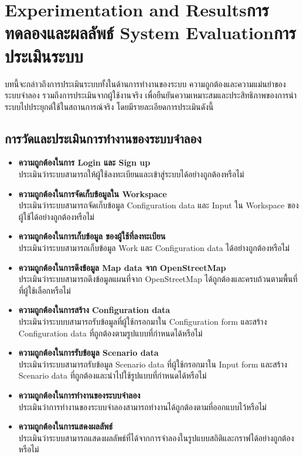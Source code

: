 \chapter{\ifproject%
\ifenglish Experimentation and Results\else การทดลองและผลลัพธ์\fi
\else%
\ifenglish System Evaluation\else การประเมินระบบ\fi
\fi}
\begin{mypara}
    \indent บทนี้จะกล่าวถึงการประเมินระบบทั้งในด้านการทำงานของระบบ ความถูกต้องและความแม่นยำของระบบจำลอง 
    รวมถึงการประเมินจากผู้ใช้งานจริง เพื่อยืนยันความเหมาะสมและประสิทธิภาพของการนำระบบไปประยุกต์ใช้ในสถานการณ์จริง
    โดยมีรายละเอียดการประเมินดังนี้
\end{mypara}

\section{การวัดและประเมินการทำงานของระบบจำลอง}
\begin{itemize}
    \item \textbf{ความถูกต้องในการ Login และ Sign up}
        \\ ประเมินว่าระบบสามารถให้ผู้ใช้ลงทะเบียนและเข้าสู่ระบบได้อย่างถูกต้องหรือไม่
    \item \textbf{ความถูกต้องในการจัดเก็บข้อมูลใน Workspace}
        \\ ประเมินว่าระบบสามารถจัดเก็บข้อมูล Configuration data และ Input ใน Workspace ของผู้ใช้ได้อย่างถูกต้องหรือไม่
    \item \textbf{ความถูกต้องในการเก็บข้อมูล ของผู้ใช้ที่ลงทะเบียน}
        \\ ประเมินว่าระบบสามารถเก็บข้อมูล Work และ Configuration data ได้อย่างถูกต้องหรือไม่
    \item \textbf{ความถูกต้องในการดึงข้อมูล Map data จาก OpenStreetMap}
        \\ ประเมินว่าระบบสามารถดึงข้อมูลแผนที่จาก OpenStreetMap ได้ถูกต้องและครบถ้วนตามพื้นที่ที่ผู้ใช้เลือกหรือไม่
    \item \textbf{ความถูกต้องในการสร้าง Configuration data}
        \\ ประเมินว่าระบบบสามารถรับข้อมูลที่ผู้ใช้กรอกมาใน Configuration form และสร้าง Configuration data ที่ถูกต้องตามรูปแบบที่กำหนดได้หรือไม่
    \item \textbf{ความถูกต้องในการรับข้อมูล Scenario data}
        \\ ประเมินว่าระบบสามารถรับข้อมูล Scenario data ที่ผู้ใช้กรอกมาใน Input form และสร้าง Scenario data ที่ถูกต้องและนำไปใช้รูปแบบที่กำหนดได้หรือไม่
    \item \textbf{ความถูกต้องในการทำงานของระบบจำลอง}
        \\ ประเมินว่าการทำงานของระบบจำลองสามารถทำงานได้ถูกต้องตามที่ออกแบบไว้หรือไม่
    \item \textbf{ความถูกต้องในการแสดงผลลัพธ์}
        \\ ประเมินว่าระบบสามารถแสดงผลลัพธ์ที่ได้จากการจำลองในรูปแบบสถิติและกราฟได้อย่างถูกต้องหรือไม่

\end{itemize}
